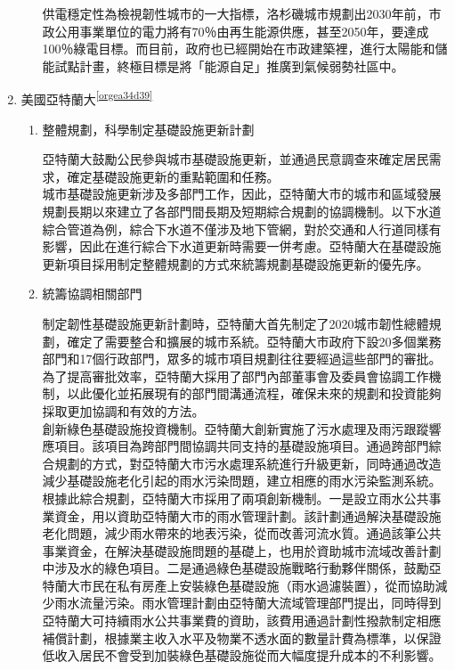 \documentclass[a4paper,12pt]{article}
\begin{document}
\begin{enumerate}
\begin{enumerate}
供電穩定性為檢視韌性城市的一大指標，洛杉磯城市規劃出2030年前，市政公用事業單位的電力將有70％由再生能源供應，甚至2050年，要達成100％綠電目標。而目前，政府也已經開始在市政建築裡，進行太陽能和儲能試點計畫，終極目標是將「能源自足」推廣到氣候弱勢社區中。\\
\end{enumerate}

\item 美國亞特蘭大\textsuperscript{\ref{orgea34d39}}
\label{sec:org0a93648}

\begin{enumerate}
\item 整體規劃，科學制定基礎設施更新計劃
\label{sec:orgf6ffea0}

亞特蘭大鼓勵公民參與城市基礎設施更新，並通過民意調查來確定居民需求，確定基礎設施更新的重點範圍和任務。\\

城市基礎設施更新涉及多部門工作，因此，亞特蘭大市的城市和區域發展規劃長期以來建立了各部門間長期及短期綜合規劃的協調機制。以下水道綜合管道為例，綜合下水道不僅涉及地下管網，對於交通和人行道同樣有影響，因此在進行綜合下水道更新時需要一併考慮。亞特蘭大在基礎設施更新項目採用制定整體規劃的方式來統籌規劃基礎設施更新的優先序。\\

\item 統籌協調相關部門
\label{sec:orge750099}

制定韌性基礎設施更新計劃時，亞特蘭大首先制定了2020城市韌性總體規劃，確定了需要整合和擴展的城市系統。亞特蘭大市政府下設20多個業務部門和17個行政部門，眾多的城市項目規劃往往要經過這些部門的審批。為了提高審批效率，亞特蘭大採用了部門內部董事會及委員會協調工作機制，以此優化並拓展現有的部門間溝通流程，確保未來的規劃和投資能夠採取更加協調和有效的方法。\\

創新綠色基礎設施投資機制。亞特蘭大創新實施了污水處理及雨污跟蹤響應項目。該項目為跨部門間協調共同支持的基礎設施項目。通過跨部門綜合規劃的方式，對亞特蘭大市污水處理系統進行升級更新，同時通過改造減少基礎設施老化引起的雨水污染問題，建立相應的雨水污染監測系統。\\

根據此綜合規劃，亞特蘭大市採用了兩項創新機制。一是設立雨水公共事業資金，用以資助亞特蘭大市的雨水管理計劃。該計劃通過解決基礎設施老化問題，減少雨水帶來的地表污染，從而改善河流水質。通過該筆公共事業資金，在解決基礎設施問題的基礎上，也用於資助城市流域改善計劃中涉及水的綠色項目。二是通過綠色基礎設施戰略行動夥伴關係，鼓勵亞特蘭大市民在私有房產上安裝綠色基礎設施（雨水過濾裝置），從而協助減少雨水流量污染。雨水管理計劃由亞特蘭大流域管理部門提出，同時得到亞特蘭大可持續雨水公共事業費的資助，該費用通過計劃性撥款制定相應補償計劃，根據業主收入水平及物業不透水面的數量計費為標準，以保證低收入居民不會受到加裝綠色基礎設施從而大幅度提升成本的不利影響。\\
\end{enumerate}


\end{enumerate}
\end{document}

